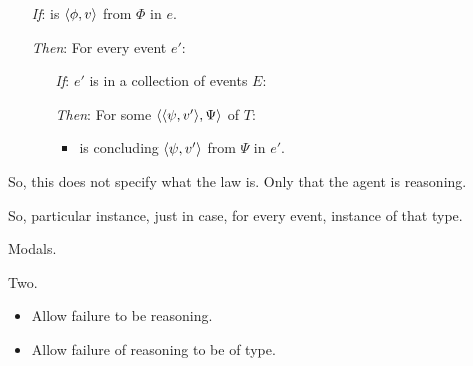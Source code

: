 \begin{note}
  \begin{idea}
    \label{idea:tR-law}

    \begin{itemize}
    \item[\emph{If}:]
      \vAgent{} is \emph{\tC{}} \(\langle \phi, v \rangle\) from \(\Phi\) in \(e\).
    \item[\emph{Then}:]
      For every event \(e'\):
      \begin{itemize}
      \item[\emph{If}:]
        \(e'\) is in a collection of events \(E\):
      \item[\emph{Then}:]
        For some \tI{} \(\langle \langle \psi, v' \rangle, \Psi \rangle\) of \(T\):
        \begin{itemize}
        \item
          \vAgent{} is concluding \(\langle \psi, v' \rangle\) from \(\Psi\) in \(e'\).
        \end{itemize}
      \end{itemize}
    \end{itemize}
    \vspace{-\baselineskip}
  \end{idea}

  So, this does not specify what the law is.
  Only that the agent is reasoning.

  So, particular instance, just in case, for every event, instance of that type.

  Modals.

  Two.

  \begin{itemize}
  \item
    Allow failure to be reasoning.
  \item
    Allow failure of reasoning to be of type.
  \end{itemize}
\end{note}

